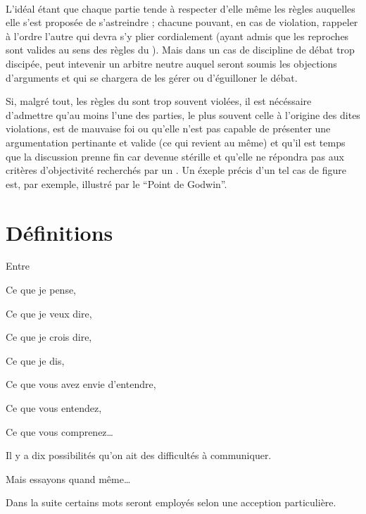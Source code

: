 \paragraph{}
L’idéal étant que chaque partie tende à respecter d’elle même les règles auquelles elle s’est proposée de s’astreindre ; chacune pouvant, en cas de violation, rappeler à l’ordre l’autre qui devra s’y plier cordialement (ayant admis que les reproches sont valides au sens des règles du \mainabbr{}). Mais dans un cas de discipline de débat trop discipée, peut intevenir un arbitre neutre auquel seront soumis les objections d’arguments et qui se chargera de les gérer ou d’éguilloner le débat.

Si, malgré tout, les règles du \mainabbr{} sont trop souvent violées, il est nécéssaire d’admettre qu’au moins l’une des parties, le plus souvent celle à l’origine des dites violations, est de mauvaise foi ou qu’elle n’est pas capable de présenter une argumentation pertinante et valide (ce qui revient au même) et qu’il est temps que la discussion prenne fin car devenue stérille et qu’elle ne répondra pas aux critères d’objectivité recherchés par un \mainabbr{}. Un éxeple précis d’un tel cas de figure est, par exemple, illustré par le \enquote{Point de Godwin}.


\section{Définitions}
\epigraph{Entre

Ce que je pense,

Ce que je veux dire,

Ce que je crois dire,

Ce que je dis,

Ce que vous avez envie d’entendre,

Ce que vous entendez,

Ce que vous comprenez…

Il y a dix possibilités qu’on ait des difficultés à communiquer.

Mais essayons quand même…
}{}
Dans la suite certains mots seront employés selon une acception particulière.

